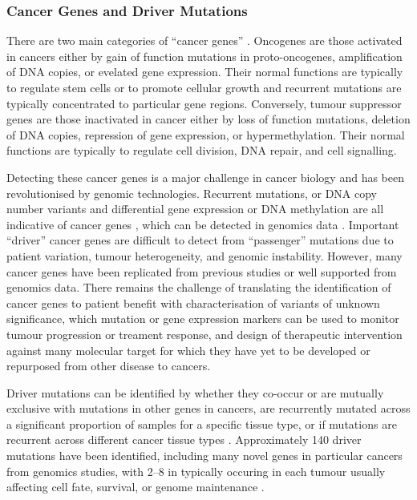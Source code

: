 \subsubsection{Cancer Genes and Driver Mutations}
There are two main categories of ``cancer genes'' \citep{Futreal2001}. Oncogenes are those activated in cancers either by gain of function mutations in proto-oncogenes, amplification of DNA copies, or evelated gene expression. Their normal functions are typically to regulate stem cells or to promote cellular growth and recurrent mutations are typically concentrated to particular gene regions. Conversely, tumour suppressor genes are those inactivated in cancer either by loss of function mutations, deletion of DNA copies, repression of gene expression, or hypermethylation. Their normal functions are typically to regulate cell division, DNA repair, and cell signalling.

Detecting these cancer genes is a major challenge in cancer biology and has been revolutionised by genomic technologies. Recurrent mutations, or DNA copy number variants and differential gene expression or DNA methylation are all indicative of cancer genes \citep{Mattison2009}, which can be detected in genomics data \citep{METABRIC2016, TCGA2013PAN}. Important ``driver'' cancer genes \citep{Stratton2009} are difficult to detect from ``passenger'' mutations due to patient variation, tumour heterogeneity, and genomic instability. However, many cancer genes have been replicated from previous studies or well supported from genomics data. There remains the challenge of translating the identification of cancer genes to patient benefit with characterisation of variants of unknown significance, which mutation or gene expression markers can be used to monitor tumour progression or treament response, and design of therapeutic intervention against many molecular target for which they have yet to be developed or repurposed from other disease to cancers. 

Driver mutations can be identified by whether they co-occur or are mutually exclusive with mutations in other genes in cancers, are recurrently mutated across a significant proportion of samples for a specific tissue type, or if mutations are recurrent across different cancer tissue types \citep{ICGC2011, TCGA2013PAN, METABRIC2016, COSMICdb, cBioPortal}. Approximately 140 driver mutations have been identified, including many novel genes in particular cancers from genomics studies, with 2--8 in typically occuring in each tumour usually affecting cell fate, survival, or genome maintenance \citep{Vogelstein2013}.

